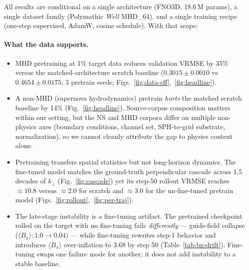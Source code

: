 \documentclass{article}
\begin{document}
All results are conditional on a single architecture (FNO3D, 18.6\,M params), a single dataset family (Polymathic \emph{Well} MHD\_64), and a single training recipe (one-step supervised, AdamW, cosine schedule). With that scope:

\paragraph{What the data supports.}
\begin{itemize}
  \setlength\itemsep{0.2em}
  \item MHD pretraining at 1\% target data reduces validation VRMSE by 35\% versus the matched-architecture scratch baseline ($0.3015 \pm 0.0010$ vs $0.4654 \pm 0.0175$; 3 pretrain seeds; Figs.~\ref{fig:data-eff},~\ref{fig:headline}).
  \item A non-MHD (supernova hydrodynamics) pretrain \emph{hurts} the matched scratch baseline by 14\% (Fig.~\ref{fig:headline}). Source-corpus composition matters within our setting, but the NS and MHD corpora differ on multiple non-physics axes (boundary conditions, channel set, SPH-to-grid substrate, normalization), so we cannot cleanly attribute the gap to physics content alone.
  \item Pretraining transfers spatial statistics but not long-horizon dynamics. The fine-tuned model matches the ground-truth perpendicular cascade across 1.5 decades of $k_\perp$ (Fig.~\ref{fig:cascade}) yet its step-50 rollout VRMSE reaches $\approx 10.8$ versus $\approx 2.0$ for scratch and $\approx 3.0$ for the un-fine-tuned pretrain model (Figs.~\ref{fig:rollout},~\ref{fig:per-traj}).
  \item The late-stage instability is a fine-tuning artifact. The pretrained checkpoint rolled on the target with no fine-tuning fails \emph{differently} --- guide-field collapse ($\langle B_x \rangle: 1.0 \to 0.04$) --- while fine-tuning rewrites step-1 behavior and introduces $\langle B_x \rangle$ over-inflation to $3.68$ by step 50 (Table~\ref{tab:bx-drift}). Fine-tuning swaps one failure mode for another; it does not add instability to a stable baseline.
\end{itemize}
\end{document}
